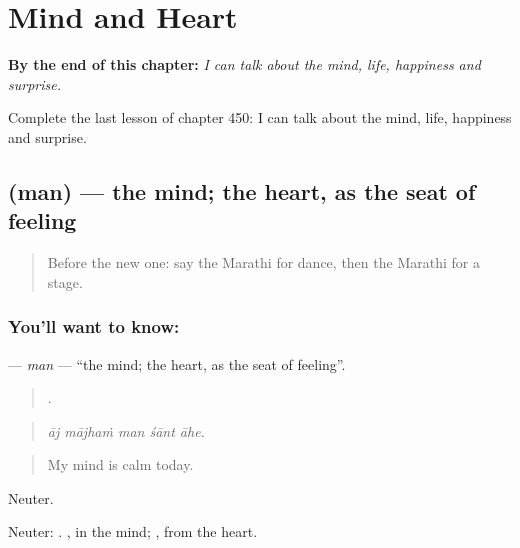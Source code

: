 
\chapter{Mind and Heart}
\label{ch:mr-mind-and-heart}

\begin{chapteropening}
\textbf{By the end of this chapter:} \emph{I can talk about the mind, life, happiness and surprise.}

Complete the last lesson of chapter 450: I can talk about the mind, life, happiness and surprise.
\end{chapteropening}

\section[\texorpdfstring{\mr{मन} (man)}{मन (man)}]{ (man) — the mind; the heart, as the seat of feeling}

\label{lesson:MR-C450-man}



\begin{quote}
Before the new one: say the Marathi for dance, then the Marathi for a stage.
\end{quote}

\subsection*{You'll want to know: }
\textbf{} — \emph{man} — \textquotedblleft{}the mind; the heart, as the seat of feeling\textquotedblright{}.

\begin{quote}
    .
\end{quote}

\begin{quote}
\emph{āj mājhaṁ man śānt āhe.}
\end{quote}

\begin{quote}
My mind is calm today.
\end{quote}

Neuter.

Neuter:  . , in the mind; , from the heart.

